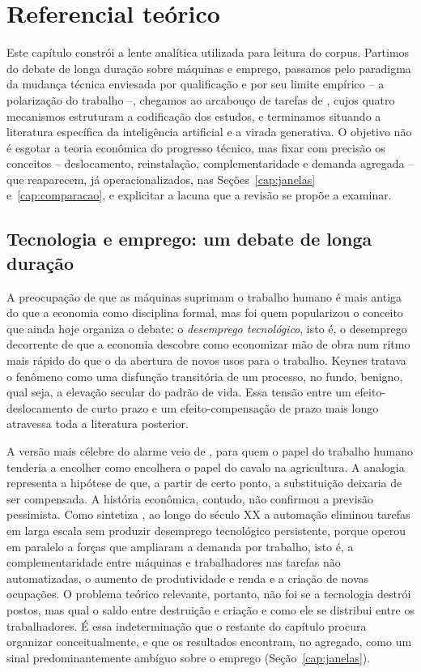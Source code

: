 \chapter{Referencial teórico}\label{cap:refteo}

Este capítulo constrói a lente analítica utilizada para leitura do corpus. Partimos do debate de longa duração sobre máquinas e emprego, passamos pelo paradigma da mudança técnica enviesada por qualificação e por seu limite empírico -- a polarização do trabalho --, chegamos ao arcabouço de tarefas de \textcite{acemogluRestrepo2019}, cujos quatro mecanismos estruturam a codificação dos estudos, e terminamos situando a literatura específica da inteligência artificial e a virada generativa. O objetivo não é esgotar a teoria econômica do progresso técnico, mas fixar com precisão os conceitos -- deslocamento, reinstalação, complementaridade e demanda agregada -- que reaparecem, já operacionalizados, nas Seções~\ref{cap:janelas} e~\ref{cap:comparacao}, e explicitar a lacuna que a revisão se propõe a examinar.

\section{Tecnologia e emprego: um debate de longa duração}

A preocupação de que as máquinas suprimam o trabalho humano é mais antiga do que a economia como disciplina formal, mas foi \textcite{keynes1930} quem popularizou o conceito que ainda hoje organiza o debate: o \emph{desemprego tecnológico}, isto é, o desemprego decorrente de que a economia descobre como economizar mão de obra num ritmo mais rápido do que o da abertura de novos usos para o trabalho.  Keynes tratava o fenômeno como uma disfunção transitória de um processo, no  fundo, benigno, qual seja, a elevação secular do padrão de vida. Essa tensão entre  um efeito-deslocamento de curto prazo e um efeito-compensação de prazo mais longo atravessa toda a literatura posterior.

A versão mais célebre do alarme veio de \textcite{leontief1983}, para quem o papel do trabalho humano tenderia a encolher como encolhera o papel do cavalo na agricultura. A analogia representa a hipótese de que, a partir de certo ponto, a substituição deixaria de ser compensada. A história econômica, contudo, não confirmou a previsão pessimista. Como sintetiza \textcite{autor2015}, ao longo do século XX a automação eliminou tarefas em larga escala sem produzir desemprego tecnológico persistente, porque operou em paralelo a forças que
ampliaram a demanda por trabalho, isto é, a complementaridade entre máquinas e trabalhadores nas tarefas não automatizadas, o aumento de produtividade e renda e a criação de novas ocupações. O problema teórico relevante, portanto, não foi se a tecnologia destrói postos, mas qual o saldo entre destruição e criação e como ele se distribui entre os trabalhadores. É essa indeterminação que o restante do capítulo procura organizar conceitualmente, e que os resultados encontram, no agregado, como um sinal predominantemente ambíguo sobre o emprego (Seção~\ref{cap:janelas}).

